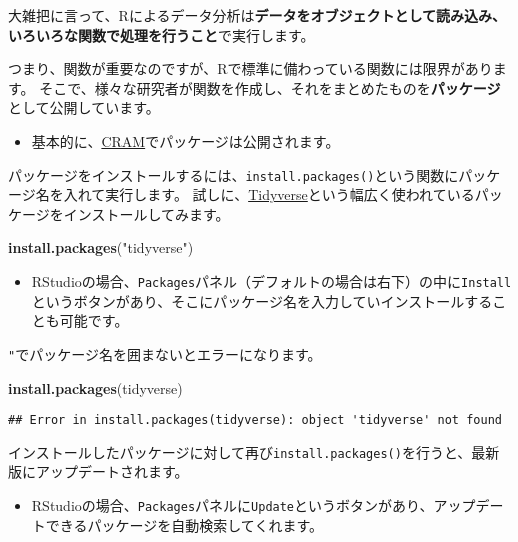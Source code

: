 \documentclass[]{bxjsarticle}
\newenvironment{Shaded}{\begin{snugshade}}{\end{snugshade}}
\newcommand{\KeywordTok}[1]{\textcolor[rgb]{0.13,0.29,0.53}{\textbf{#1}}}
\newcommand{\NormalTok}[1]{#1}
\newcommand{\StringTok}[1]{\textcolor[rgb]{0.31,0.60,0.02}{#1}}
\providecommand{\tightlist}{%
  \setlength{\itemsep}{0pt}\setlength{\parskip}{0pt}}
\begin{document}
大雑把に言って、Rによるデータ分析は\textbf{データをオブジェクトとして読み込み、いろいろな関数で処理を行うこと}で実行します。

つまり、関数が重要なのですが、Rで標準に備わっている関数には限界があります。
そこで、様々な研究者が関数を作成し、それをまとめたものを\textbf{パッケージ}として公開しています。

\begin{itemize}
\tightlist
\item
  基本的に、\href{https://cran.r-project.org/}{CRAM}でパッケージは公開されます。
\end{itemize}

パッケージをインストールするには、\texttt{install.packages()}という関数にパッケージ名を入れて実行します。
試しに、\href{https://www.tidyverse.org/}{Tidyverse}という幅広く使われているパッケージをインストールしてみます。

\begin{Shaded}
\begin{Highlighting}[]
\KeywordTok{install.packages}\NormalTok{(}\StringTok{"tidyverse"}\NormalTok{)}
\end{Highlighting}
\end{Shaded}

\begin{itemize}
\tightlist
\item
  RStudioの場合、\texttt{Packages}パネル（デフォルトの場合は右下）の中に\texttt{Install}というボタンがあり、そこにパッケージ名を入力していインストールすることも可能です。
\end{itemize}

\texttt{"}でパッケージ名を囲まないとエラーになります。

\begin{Shaded}
\begin{Highlighting}[]
\KeywordTok{install.packages}\NormalTok{(tidyverse)}
\end{Highlighting}
\end{Shaded}

\begin{verbatim}
## Error in install.packages(tidyverse): object 'tidyverse' not found
\end{verbatim}

インストールしたパッケージに対して再び\texttt{install.packages()}を行うと、最新版にアップデートされます。

\begin{itemize}
\tightlist
\item
  RStudioの場合、\texttt{Packages}パネルに\texttt{Update}というボタンがあり、アップデートできるパッケージを自動検索してくれます。
\end{itemize}
\end{document}
